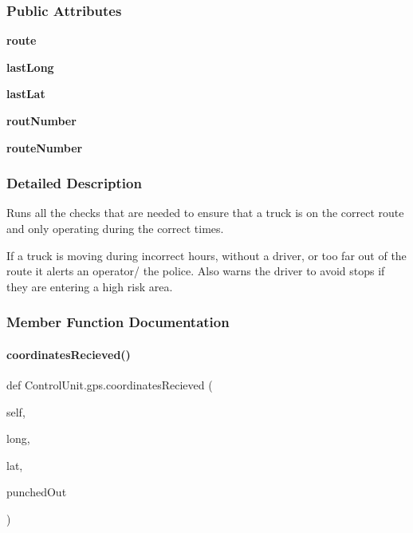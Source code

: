 \subsubsection*{Public Attributes}
\begin{DoxyCompactItemize}
\item 
\mbox{\label{class_control_unit_1_1gps_a1977c1ca7fb5629f6bfdd1a928cee30b}} 
{\bfseries route}
\item 
\mbox{\label{class_control_unit_1_1gps_a1c2708923b903bfc50f73889caedfbb4}} 
{\bfseries last\+Long}
\item 
\mbox{\label{class_control_unit_1_1gps_a921dba663e34bb634dd666358c8a3631}} 
{\bfseries last\+Lat}
\item 
\mbox{\label{class_control_unit_1_1gps_a211a3000d11f80e88ef4379492119fc2}} 
{\bfseries rout\+Number}
\item 
\mbox{\label{class_control_unit_1_1gps_a520316b9f11168b0111a28add82a6c10}} 
{\bfseries route\+Number}
\end{DoxyCompactItemize}


\subsubsection{Detailed Description}
Runs all the checks that are needed to ensure that a truck is on the correct route and only operating during the correct times. 

If a truck is moving during incorrect hours, without a driver, or too far out of the route it alerts an operator/ the police. Also warns the driver to avoid stops if they are entering a high risk area. 

\subsubsection{Member Function Documentation}
\mbox{\label{class_control_unit_1_1gps_ad56e605e44ee3ba92ca487a35299927a}} 
\paragraph{\texorpdfstring{coordinatesRecieved()}{coordinatesRecieved()}}
{\footnotesize\ttfamily def Control\+Unit.\+gps.\+coordinates\+Recieved (\begin{DoxyParamCaption}\item[{}]{self,  }\item[{}]{long,  }\item[{}]{lat,  }\item[{}]{punched\+Out }\end{DoxyParamCaption})}



